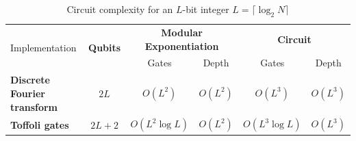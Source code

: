 \documentclass{article}
\begin{document}
\begin{table}[h]
    \centering
    \begin{tabular}{|l|c|c|c|c|c|}
        \hline
            \multirow{2}{*}{Implementation} & \multirow{2}{*}{\textbf{Qubits}} & \multicolumn{2}{c|}{\textbf{Modular Exponentiation}} & \multicolumn{2}{c|}{\textbf{Circuit}} \\
        \cline{3-6}
           & & Gates & Depth & Gates & Depth \\
        \hline
            \textbf{Discrete Fourier transform} & $2L$ & $O(L^2)$ & $O(L^2)$ & $O(L^3)$ & $O(L^3)$ \\
        \hline
            \textbf{Toffoli gates} & $2L + 2$ & $O(L^2 \log L)$ & $O(L^2)$ & $O(L^3 \log L)$ & $O(L^3)$ \\
        \hline
    \end{tabular}
    \caption{Circuit complexity for an $L$-bit integer $L = \lceil \log_2 N \rceil$}
\end{table}
\end{document}
